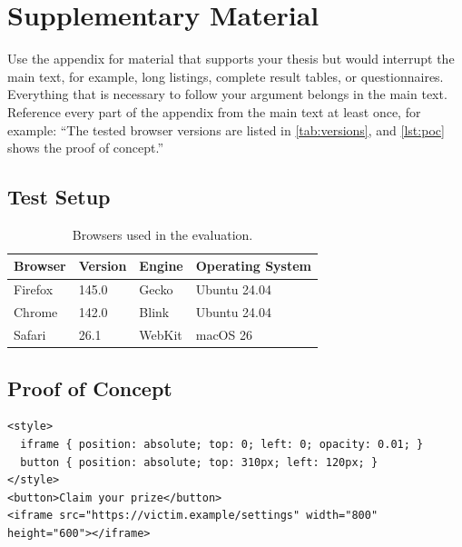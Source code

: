 \chapter{Supplementary Material} \label{chap:appendix}

Use the appendix for material that supports your thesis but would interrupt the main text, for example, long listings, complete result tables, or questionnaires.
Everything that is necessary to follow your argument belongs in the main text.
Reference every part of the appendix from the main text at least once, for example: \enquote{The tested browser versions are listed in \autoref{tab:versions}, and \autoref{lst:poc} shows the proof of concept.}

\section{Test Setup}

\begin{table}[htbp]
    \centering
    \caption{Browsers used in the evaluation.}
    \label{tab:versions}
    \begin{tabular}{@{}llll@{}}
      \toprule
      Browser & Version & Engine & Operating System \\
      \midrule
      Firefox & 145.0 & Gecko & Ubuntu 24.04 \\
      Chrome & 142.0 & Blink & Ubuntu 24.04 \\
      Safari & 26.1 & WebKit & macOS 26 \\
      \bottomrule
    \end{tabular}
\end{table}

\section{Proof of Concept}

\begin{listing}[htbp]
\begin{verbatim}
<style>
  iframe { position: absolute; top: 0; left: 0; opacity: 0.01; }
  button { position: absolute; top: 310px; left: 120px; }
</style>
<button>Claim your prize</button>
<iframe src="https://victim.example/settings" width="800" height="600"></iframe>
\end{verbatim}
\caption{Clickjacking proof of concept: the invisible frame is placed above the button.}
\label{lst:poc}
\end{listing}
